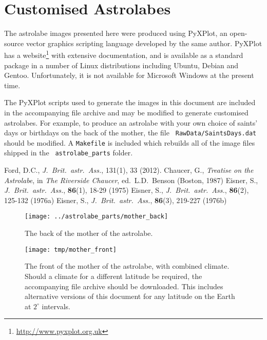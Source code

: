 \documentclass[a4paper,onecolumn,10pt]{article}
\begin{document}
\section*{Customised Astrolabes}

The astrolabe images presented here were produced using PyXPlot, an open-source
vector graphics scripting language developed by the same author.  PyXPlot has a
website\footnote{\url{http://www.pyxplot.org.uk}} with extensive documentation,
and is available as a standard package in a number of Linux distributions
including Ubuntu, Debian and Gentoo. Unfortunately, it is not available for
Microsoft Windows at the present time.

The PyXPlot scripts used to generate the images in this document are included
in the accompanying file archive and may be modified to generate customised
astrolabes. For example, to produce an astrolabe with your own choice of
saints' days or birthdays on the back of the mother, the file {\tt
Raw\-Data/\-Saints\-Days\-.dat} should be modified. A {\tt Makefile} is
included which rebuilds all of the image files shipped in the {\tt
astrolabe\_parts} folder.

\begin{thebibliography}{9}
Ford, D.C., \textit{J.\ Brit.\ astr.\ Ass.}, 131(1), 33 (2012).
Chaucer, G., \textit{Treatise on the Astrolabe}, in {\it The Riverside Chaucer}, ed.\ L.D.\ Benson (Boston, 1987)
Eisner, S., \textit{J.\ Brit.\ astr.\ Ass.}, \textbf{86}(1), 18-29 (1975)
Eisner, S., \textit{J.\ Brit.\ astr.\ Ass.}, \textbf{86}(2), 125-132 (1976a)
Eisner, S., \textit{J.\ Brit.\ astr.\ Ass.}, \textbf{86}(3), 219-227 (1976b)
\end{thebibliography}

\newpage

\begin{figure}
\centerline{\texttt{[image: ../astrolabe\_parts/mother\_back]}}
\caption{The back of the mother of the astrolabe.}
\label{mother_back}
\end{figure}

\begin{figure}
\centerline{\texttt{[image: tmp/mother\_front]}}
\caption{The front of the mother of the astrolabe, with combined climate.
Should a climate for a different latitude be required, the accompanying file archive should be downloaded. This includes alternative versions of this document for any latitude on the Earth at $2^\circ$ intervals.}
\label{mother_front}
\end{figure}
\end{document}
